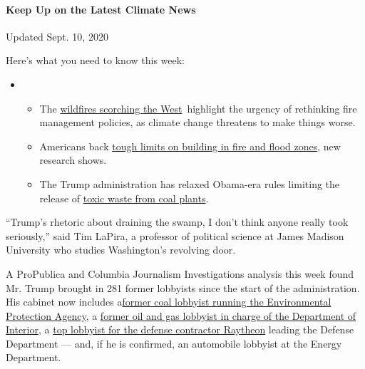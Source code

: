 \hypertarget{keep-up-on-the-latest-climate-news}{%
\paragraph{Keep Up on the Latest Climate
News}\label{keep-up-on-the-latest-climate-news}}

Updated Sept. 10, 2020

Here's what you need to know this week:

\begin{itemize}
\item
  \begin{itemize}
  \tightlist
  \item
    The
    \href{https://www.nytimes3xbfgragh.onion/2020/09/10/climate/wildfires-climate-policy.html?action=click\&pgtype=Article\&state=default\&region=MAIN_CONTENT_1\&context=storylines_keepup}{wildfires
    scorching the West}~highlight the urgency of rethinking fire
    management policies, as climate change threatens to make things
    worse.
  \item
    Americans back
    \href{https://www.nytimes3xbfgragh.onion/2020/09/04/climate/flood-fire-building-restrictions.html?action=click\&pgtype=Article\&state=default\&region=MAIN_CONTENT_1\&context=storylines_keepup}{tough
    limits on building in fire and flood zones}, new research shows.
  \item
    The Trump administration has relaxed Obama-era rules limiting the
    release of
    \href{https://www.nytimes3xbfgragh.onion/2020/08/31/climate/trump-coal-plants.html?action=click\&pgtype=Article\&state=default\&region=MAIN_CONTENT_1\&context=storylines_keepup}{toxic
    waste from coal plants}.
  \end{itemize}
\end{itemize}

``Trump's rhetoric about draining the swamp, I don't think anyone really
took seriously,'' said Tim LaPira, a professor of political science at
James Madison University who studies Washington's revolving door.

A ProPublica and Columbia Journalism Investigations analysis this week
found Mr. Trump brought in 281 former lobbyists since the start of the
administration. His cabinet now includes
a\href{https://www.nytimes3xbfgragh.onion/2018/08/01/climate/andrew-wheeler-epa-lobbying.html}{former
coal lobbyist running the Environmental Protection Agency}, a
\href{https://www.nytimes3xbfgragh.onion/2019/04/04/climate/david-bernhardt-interior-lobbying.html}{former
oil and gas lobbyist in charge of the Department of Interior,} a
\href{https://www.nytimes3xbfgragh.onion/2019/07/23/us/politics/mark-esper-secretary-defense.html}{top
lobbyist for the defense contractor Raytheon} leading the Defense
Department --- and, if he is confirmed, an automobile lobbyist at the
Energy Department.

